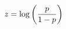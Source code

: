 \documentclass[preview]{standalone}
\begin{document}
\begin{align*}
\special{dvisvgm:raw <g id='unique000'>}z=\log{\left(\frac{p}{1-p}\right)}\special{dvisvgm:raw </g>}
\end{align*}
\end{document}
